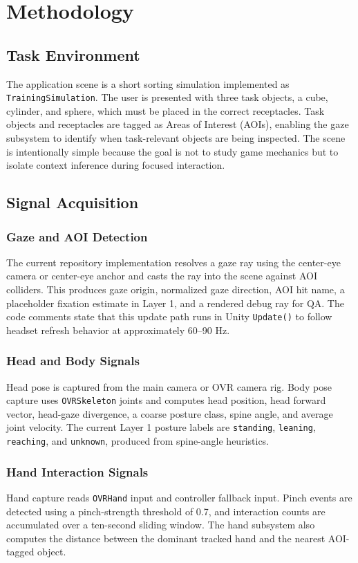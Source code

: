 \documentclass[10pt,twocolumn]{article}
\begin{document}
\section{Methodology}
\subsection{Task Environment}
The application scene is a short sorting simulation implemented as \texttt{TrainingSimulation}. The user is presented with three task objects, a cube, cylinder, and sphere, which must be placed in the correct receptacles. Task objects and receptacles are tagged as Areas of Interest (AOIs), enabling the gaze subsystem to identify when task-relevant objects are being inspected. The scene is intentionally simple because the goal is not to study game mechanics but to isolate context inference during focused interaction.

\subsection{Signal Acquisition}
\subsubsection{Gaze and AOI Detection}
The current repository implementation resolves a gaze ray using the center-eye camera or center-eye anchor and casts the ray into the scene against AOI colliders. This produces gaze origin, normalized gaze direction, AOI hit name, a placeholder fixation estimate in Layer 1, and a rendered debug ray for QA. The code comments state that this update path runs in Unity \texttt{Update()} to follow headset refresh behavior at approximately 60--90 Hz.

\subsubsection{Head and Body Signals}
Head pose is captured from the main camera or OVR camera rig. Body pose capture uses \texttt{OVRSkeleton} joints and computes head position, head forward vector, head-gaze divergence, a coarse posture class, spine angle, and average joint velocity. The current Layer 1 posture labels are \texttt{standing}, \texttt{leaning}, \texttt{reaching}, and \texttt{unknown}, produced from spine-angle heuristics.

\subsubsection{Hand Interaction Signals}
Hand capture reads \texttt{OVRHand} input and controller fallback input. Pinch events are detected using a pinch-strength threshold of 0.7, and interaction counts are accumulated over a ten-second sliding window. The hand subsystem also computes the distance between the dominant tracked hand and the nearest AOI-tagged object.
\end{document}
